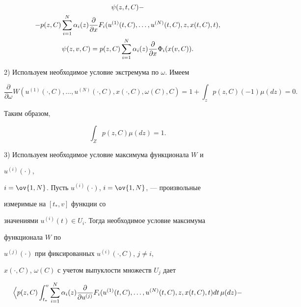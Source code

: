 \begin{pf}
\begin{gather}
\psi(z,t,C)-\notag\\ 


-p(z,C)\sum^N_{i=1}\alpha_i(z)\frac{\partial}{\partial x}F_i 


(u^{(1)}(t,C),\dotsc,u^{(N)}(t,C),z,x(t,C),t),\\ 


\psi(z,v,C)=p(z,C)\sum^N_{i=1}\alpha_i(z) 


\frac{\partial}{\partial x}\Phi_i(x(v,C)). 


\end{gather} 


 


2) Используем необходимое условие экстремума по $\omega$. Имеем 


$$ 


\frac{\partial}{\partial \omega}W 


(u^{(1)}(\cdot,C),\dotsc,u^{(N)}(\cdot,C),x(\cdot,C), 


\omega(C),C)=1+\int_z p(z,C)(-1)\mu(dz)=0. 


$$ 


Таким образом, 


\begin{equation} 


\int_Z p(z,C)\mu(dz)=1. 


\end{equation} 


 


3) Используем необходимое условие максимума функционала $W$ и


$u^{(i)}(\cdot)$, 


$i=\ov{1,N}$. Пусть $u^{(i)}(\cdot)$, $i=\ov{1,N}$, --- произвольные 


измеримые на $[t_*,v]$ функции со 


значениями $u^{(i)}(t)\in U_i$. Тогда необходимое условие максимума 


функционала $W$ по 


$u^{(j)}(\cdot)$ при фиксированных $u^{(i)}(\cdot,C)$, $j\ne i$, 


$x(\cdot,C)$, $\omega(C)$ с учетом выпуклости множеств $U_j$ дает 


\begin{gather*} 


\Big\la p(z,C)\int^v_{t_*}\sum^N_{i=1}\alpha_i(z)


\frac{\partial}{\partial u^{(j)}}F_i(u^{(1)}(t,C),\dotsc,


u^{(N)}(t,C),z,x(t,C),t)dt\,\mu(dz)- \\



\end{gather*}
\end{pf}
